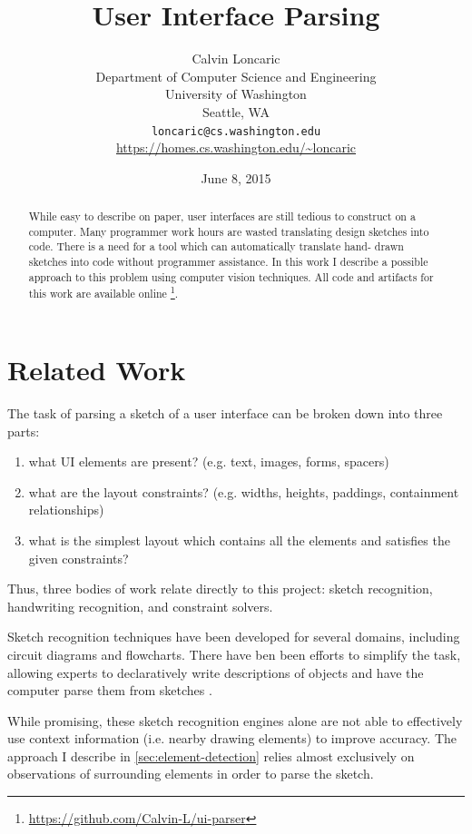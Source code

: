 \documentclass{article}
\title{User Interface Parsing}
\author{
Calvin Loncaric\\
Department of Computer Science and Engineering\\
University of Washington\\
Seattle, WA\\
\texttt{loncaric@cs.washington.edu}\\
\url{https://homes.cs.washington.edu/\~loncaric}}
\date{June 8, 2015}
\begin{document}
\maketitle

\begin{abstract}
While easy to describe on paper, user interfaces are still tedious to construct
on a computer. Many programmer work hours are wasted translating design sketches
into code. There is a need for a tool which can automatically translate hand-%
drawn sketches into code without programmer assistance. In this work I describe
a possible approach to this problem using computer vision techniques. All code
and artifacts for this work are available online%
\footnote{\url{https://github.com/Calvin-L/ui-parser}}.
\end{abstract}

\section{Related Work}

The task of parsing a sketch of a user interface can be broken down into three
parts:
\begin{enumerate}
\item what UI elements are present? (e.g. text, images, forms, spacers)
\item what are the layout constraints? (e.g. widths, heights, paddings,
    containment relationships)
\item what is the simplest layout which contains all the elements and satisfies
    the given constraints?
\end{enumerate}

Thus, three bodies of work relate directly to this project: sketch recognition,
handwriting recognition, and constraint solvers.

Sketch recognition techniques have been developed for several domains, including
circuit diagrams and flowcharts. There have ben been efforts to simplify the
task, allowing experts to declaratively write descriptions of objects and have
the computer parse them from sketches \cite{ShapeDescriptions2004,
SketchREAD2007}.

While promising, these sketch recognition engines alone are not able to
effectively use context information (i.e. nearby drawing elements) to improve
accuracy. The approach I describe in \autoref{sec:element-detection} relies
almost exclusively on observations of surrounding elements in order to parse the
sketch.
\end{document}
